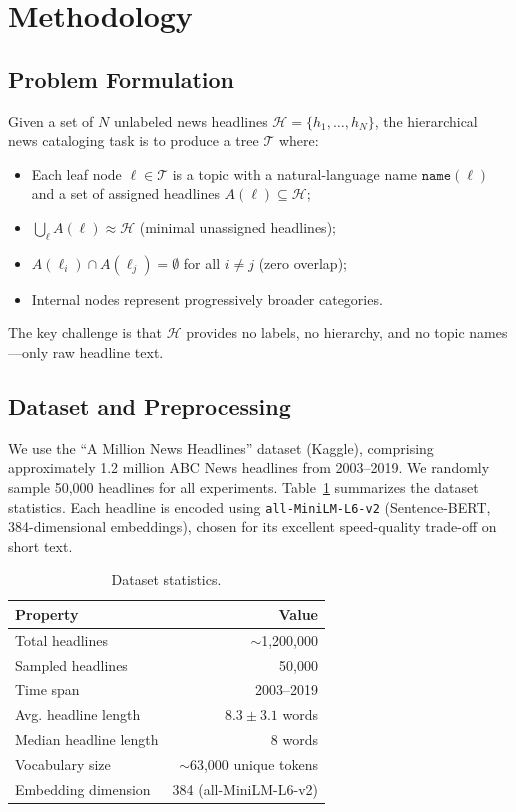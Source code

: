 \documentclass[10pt,twocolumn,twoside]{article}
\begin{document}
\section{Methodology}

\subsection{Problem Formulation}

Given a set of $N$ unlabeled news headlines $\mathcal{H} = \{h_1, \ldots, h_N\}$, the 
hierarchical news cataloging task is to produce a tree $\mathcal{T}$ where:
\begin{itemize}[nosep]
    \item Each leaf node $\ell \in \mathcal{T}$ is a topic with a natural-language name 
    $\texttt{name}(\ell)$ and a set of assigned headlines $A(\ell) \subseteq \mathcal{H}$;
    \item $\bigcup_{\ell} A(\ell) \approx \mathcal{H}$ (minimal unassigned headlines);
    \item $A(\ell_i) \cap A(\ell_j) = \emptyset$ for all $i \neq j$ (zero overlap);
    \item Internal nodes represent progressively broader categories.
\end{itemize}
The key challenge is that $\mathcal{H}$ provides no labels, no hierarchy, and no topic 
names---only raw headline text.

\subsection{Dataset and Preprocessing}
We use the ``A Million News Headlines'' dataset (Kaggle), comprising approximately 1.2 million 
ABC News headlines from 2003--2019. We randomly sample 50,000 headlines for all experiments. 
Table~\ref{tab:dataset} summarizes the dataset statistics. Each headline is encoded using 
\texttt{all-MiniLM-L6-v2} (Sentence-BERT, 384-dimensional embeddings), chosen for its 
excellent speed-quality trade-off on short text.

\begin{table}[h]
\centering
\caption{Dataset statistics.}
\label{tab:dataset}
\small
\begin{tabular}{lr}
\toprule
Property & Value \\
\midrule
Total headlines & $\sim$1,200,000 \\
Sampled headlines & 50,000 \\
Time span & 2003--2019 \\
Avg. headline length & $8.3 \pm 3.1$ words \\
Median headline length & 8 words \\
Vocabulary size & $\sim$63,000 unique tokens \\
Embedding dimension & 384 (all-MiniLM-L6-v2) \\
\bottomrule
\end{tabular}
\end{table}
\end{document}
